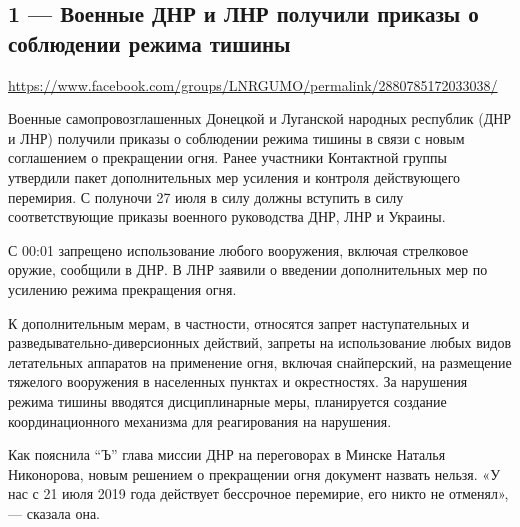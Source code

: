  
 

\subsection{1 --- Военные ДНР и ЛНР получили приказы о соблюдении режима тишины}
\url{https://www.facebook.com/groups/LNRGUMO/permalink/2880785172033038/}


Военные самопровозглашенных Донецкой и Луганской народных республик (ДНР и
ЛНР) получили приказы о соблюдении режима тишины в связи с новым соглашением о
прекращении огня. Ранее участники Контактной группы утвердили пакет
дополнительных мер усиления и контроля действующего перемирия. С полуночи 27
июля в силу должны вступить в силу соответствующие приказы военного
руководства ДНР, ЛНР и Украины.

С 00:01 запрещено использование любого вооружения, включая стрелковое оружие,
сообщили в ДНР. В ЛНР заявили о введении дополнительных мер по усилению режима
прекращения огня.

К дополнительным мерам, в частности, относятся запрет наступательных и
разведывательно-диверсионных действий, запреты на использование любых видов
летательных аппаратов на применение огня, включая снайперский, на размещение
тяжелого вооружения в населенных пунктах и окрестностях. За нарушения режима
тишины вводятся дисциплинарные меры, планируется создание координационного
механизма для реагирования на нарушения.

Как пояснила “Ъ” глава миссии ДНР на переговорах в Минске Наталья Никонорова,
новым решением о прекращении огня документ назвать нельзя. «У нас с 21 июля
2019 года действует бессрочное перемирие, его никто не отменял»,— сказала она.
